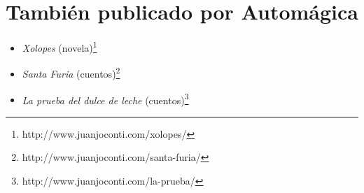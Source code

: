 \documentclass[11pt,twoside,openright]{book}
\begin{document}
\cleardoublepage

\setcounter{footnote}{0}

\section*{También publicado por Automágica}

\begin{itemize}
\item \emph{Xolopes} (novela)\footnote{http://www.juanjoconti.com/xolopes/}
\item \emph{Santa Furia} (cuentos)\footnote{http://www.juanjoconti.com/santa-furia/}
\item \emph{La prueba del dulce de leche} (cuentos)\footnote{http://www.juanjoconti.com/la-prueba/}
\end{itemize}


\end{document}
